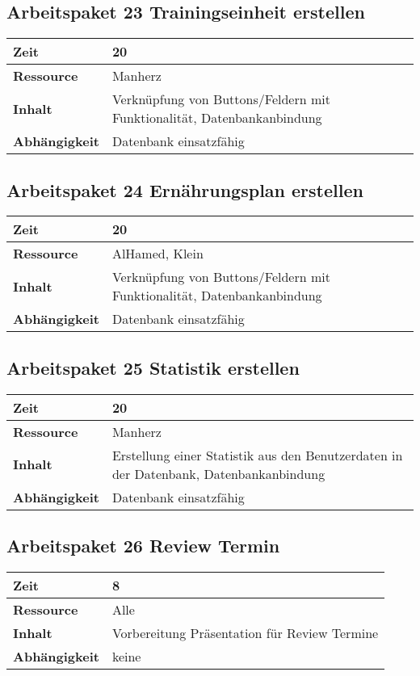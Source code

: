 \documentclass[12pt,a4paper,onecolumn]{article}
\begin{document}
\subsection{Arbeitspaket 23 Trainingseinheit erstellen}
\begin{tabularx}{\textwidth}{|l|X|}
\hline
     \textbf{Zeit} & 20 \\
     \hline
     \textbf{Ressource} & Manherz\\
     \hline
     \textbf{Inhalt} &  Verknüpfung von Buttons/Feldern mit Funktionalität, Datenbankanbindung\\
     \hline
     \textbf{Abhängigkeit} & Datenbank einsatzfähig\\
\hline
\end{tabularx}

\subsection{Arbeitspaket 24 Ernährungsplan erstellen}
\begin{tabularx}{\textwidth}{|l|X|}
\hline
     \textbf{Zeit} & 20 \\
     \hline
     \textbf{Ressource} & AlHamed, Klein\\
     \hline
     \textbf{Inhalt} &  Verknüpfung von Buttons/Feldern mit Funktionalität, Datenbankanbindung\\
     \hline
     \textbf{Abhängigkeit} & Datenbank einsatzfähig\\
\hline
\end{tabularx}

\subsection{Arbeitspaket 25 Statistik erstellen}
\begin{tabularx}{\textwidth}{|l|X|}
\hline
     \textbf{Zeit} & 20\\
     \hline
     \textbf{Ressource} & Manherz\\
     \hline
     \textbf{Inhalt} & Erstellung einer Statistik aus den Benutzerdaten in der Datenbank, Datenbankanbindung\\
     \hline
     \textbf{Abhängigkeit} & Datenbank einsatzfähig\\
\hline
\end{tabularx}

\subsection{Arbeitspaket 26 Review Termin}
\begin{tabularx}{\textwidth}{|l|X|}
\hline
     \textbf{Zeit} & 8\\
     \hline
     \textbf{Ressource} & Alle\\
     \hline
     \textbf{Inhalt} &  Vorbereitung Präsentation für Review Termine\\
     \hline
     \textbf{Abhängigkeit} & keine\\
\hline
\end{tabularx}
\end{document}
